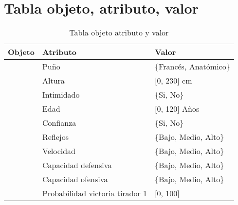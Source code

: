 \chapter{Tabla objeto, atributo, valor}
\label{cap:tabla objeto atributo valor}

\begin{longtable}{>{\bfseries}lll}
  \caption{Tabla objeto atributo y valor}
  \label{tab:Tabla objeto atributo y valor}

  \endfirsthead
  \endhead

  Objeto & Atributo & Valor \\ \hline
  \multicolumn{1}{l|}{\multirow{4}{*}{Tirador}} & Puño & \{Francés, Anatómico\} \\ \cline{2-3}
  \multicolumn{1}{l|}{} & Altura & {[}0, 230{]} cm \\ \cline{2-3}
  \multicolumn{1}{l|}{} & Intimidado & \{Si, No\} \\ \cline{2-3}
  \multicolumn{1}{l|}{} & Edad & {[}0, 120{]} Años \\ \cline{2-3}

  \multicolumn{1}{l|}{} & Confianza & \{Si, No\} \\ \cline{2-3}
  \multicolumn{1}{l|}{} & Reflejos & \{Bajo, Medio, Alto\} \\ \cline{2-3}
  \multicolumn{1}{l|}{} & Velocidad & \{Bajo, Medio, Alto\} \\ \cline{2-3}
  \multicolumn{1}{l|}{} & Capacidad defensiva & \{Bajo, Medio, Alto\} \\ \cline{2-3}
  \multicolumn{1}{l|}{} & Capacidad ofensiva & \{Bajo, Medio, Alto\} \\ \cline{2-3}

  \multicolumn{1}{l|}{} & Probabilidad victoria tirador 1 & [0, 100] \\ \cline{2-3}
\end{longtable}


